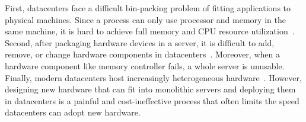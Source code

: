 \documentclass[10pt,times,twocolumn]{z2-article}
\begin{document}
First, datacenters face a difficult bin-packing problem of fitting applications to physical machines.
Since a process can only use processor and memory in the same machine, 
it is hard to achieve full memory and CPU resource utilization~\cite{Barroso-COMPUTER,Quasar-ASPLOS,PowerNap}.
Second, after packaging hardware devices in a server, it is difficult to add, remove, or change 
hardware components in datacenters~\cite{FB-Wedge100}. 
Moreover, when a hardware component like memory controller fails, a whole server is unusable.
Finally, modern datacenters host increasingly heterogeneous hardware~\cite{sigarch-dc,Putnam14-FPGA,TPU,DPU}.
However, designing new hardware that can fit into monolithic servers and deploying them in datacenters
is a painful and cost-ineffective process 
that often limits the speed datacenters can adopt new hardware.

\end{document}
